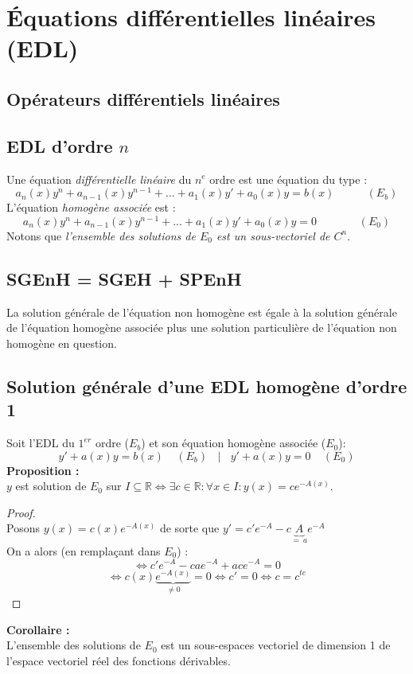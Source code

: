 \documentclass	[11pt, a4paper, openany]{book}
\begin{document}
\section{Équations différentielles linéaires (EDL)}
\subsection{Opérateurs différentiels linéaires}
\subsection{EDL d'ordre $n$}
Une équation \textit{différentielle linéaire} du $n^e$ ordre est une équation du type : 
$$a_n(x)y^n + a_{n-1}(x)y^{n-1} + ... + a_1(x)y' + a_0(x)y = b(x)\ \ \ \ \ \ \ \ \ \ \ \ \ (E_b)$$
L'équation \textit{homogène associée} est : 
$$a_n(x)y^n + a_{n-1}(x)y^{n-1} + ... + a_1(x)y' + a_0(x)y = 0\ \ \ \ \ \ \ \ \ \ \ \ \ \ \ \ \ (E_0)$$
Notons que \textit{l'ensemble des solutions de $E_0$ est un sous-vectoriel de $C^n$}.

\subsection{SGEnH = SGEH + SPEnH}
La solution générale de l'équation non homogène est égale à la solution générale de l'équation homogène associée plus une solution particulière de l'équation non homogène en question.

\subsection{Solution générale d'une EDL homogène d'ordre 1}
Soit l'EDL du $1^{er}$ ordre ($E_b$) et son équation homogène associée ($E_0$):
$$y' + a(x)y = b(x)\ \ \ \ \ (E_b)\ \ \ \ |\ \ \ \ y' + a(x)y = 0\ \ \ \ \ (E_0)$$
\textbf{Proposition :}\\
$y$ est solution de $E_0$ sur $I \subseteq \mathbb{R} \Leftrightarrow \exists c \in \mathbb{R} : \forall x \in I : y(x) = ce^{-A(x)}$.
\begin{proof}
\ \\
Posons $y(x) = c(x)e^{-A(x)}$ de sorte que $y' = c'e^{-A} - c\underbrace{A}_{=\ a}e^{-A}$\\
On a alors (en remplaçant dans $E_0$)  :\\
$$\Leftrightarrow c'e^{-A} - cae^{-A} + ace^{-A} = 0$$
$$\Leftrightarrow c(x)\underbrace{e^{-A(x)}}_{\neq 0} = 0 \Leftrightarrow c' = 0 \Leftrightarrow c = c^{te}$$
\end{proof}
\textbf{Corollaire :}\\
L'ensemble des solutions de $E_0$ est un sous-espaces vectoriel de dimension 1 de l'espace vectoriel réel des fonctions dérivables.
\end{document}
